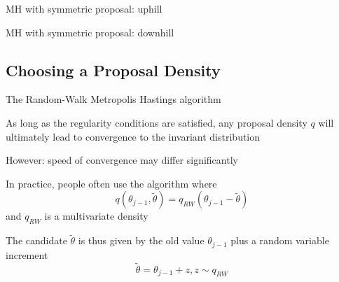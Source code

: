 \begin{frame}{MH with symmetric proposal: uphill}
  \bigskip
  \begin{center}
  \scalebox{.7}{}
  \end{center}
\end{frame}


\begin{frame}{MH with symmetric proposal: downhill}
  \bigskip
  \begin{center}
  \scalebox{.7}{}
  \end{center}
\end{frame}


\subsection{Choosing a Proposal Density}
\begin{frame}{The Random-Walk Metropolis Hastings algorithm}
\begin{witemize}
    \item As long as the regularity conditions are satisfied, any proposal density $q$ will ultimately lead to convergence to the invariant distribution
    \item However: speed of convergence may differ significantly
    \item In practice, people often use the  algorithm where
    \begin{equation}
    q\left( \theta_{j-1},\tilde \theta \right) = {q_{RW}}\left( \theta_{j-1}-\tilde \theta \right)
    \end{equation}
    and $q_{RW}$ is a multivariate density
    \item The candidate $\tilde \theta$ is thus given by the old value $\theta_{j-1}$ plus a random variable increment
    \begin{equation}
    \tilde \theta=\theta_{j-1}+z, z\sim q_{RW}
    \end{equation}
 \end{witemize}
\end{frame}

